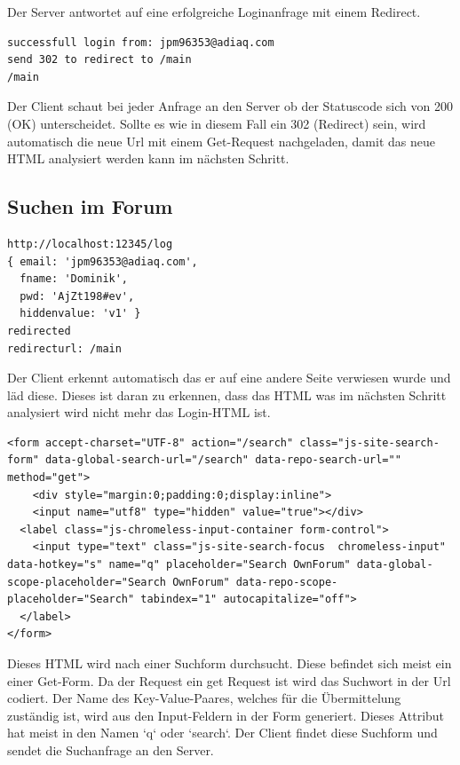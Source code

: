 Der Server antwortet auf eine erfolgreiche Loginanfrage mit einem Redirect.
\begin{lstlisting}[language=HTML5]
successfull login from: jpm96353@adiaq.com
send 302 to redirect to /main
/main
\end{lstlisting}

Der Client schaut bei jeder Anfrage an den Server ob der Statuscode sich von 200 (OK) unterscheidet. Sollte es wie in diesem Fall ein 302 (Redirect) sein, wird automatisch die neue Url mit einem Get-Request nachgeladen, damit das neue HTML analysiert werden kann im nächsten Schritt.
\newpage


\subsection{Suchen im Forum}
\begin{lstlisting}[language=HTML5]
http://localhost:12345/log
{ email: 'jpm96353@adiaq.com',
  fname: 'Dominik',
  pwd: 'AjZt198#ev',
  hiddenvalue: 'v1' }
redirected
redirecturl: /main
\end{lstlisting}


Der Client erkennt automatisch das er auf eine andere Seite verwiesen wurde und läd diese. Dieses ist daran zu erkennen, dass das HTML was im nächsten Schritt analysiert wird nicht mehr das Login-HTML ist.

\begin{lstlisting}[language=HTML5]
<form accept-charset="UTF-8" action="/search" class="js-site-search-form" data-global-search-url="/search" data-repo-search-url="" method="get">
	<div style="margin:0;padding:0;display:inline">
	<input name="utf8" type="hidden" value="true"></div>
  <label class="js-chromeless-input-container form-control">
    <input type="text" class="js-site-search-focus  chromeless-input" data-hotkey="s" name="q" placeholder="Search OwnForum" data-global-scope-placeholder="Search OwnForum" data-repo-scope-placeholder="Search" tabindex="1" autocapitalize="off">
  </label>
</form>
\end{lstlisting}

Dieses HTML wird nach einer Suchform durchsucht. Diese befindet sich meist ein einer Get-Form. Da der Request ein get Request ist wird das Suchwort in der Url codiert. Der Name des Key-Value-Paares, welches für die Übermittelung zuständig ist, wird aus den Input-Feldern in der Form generiert. Dieses Attribut hat meist in den Namen `q` oder `search`. Der Client findet diese Suchform und sendet die Suchanfrage an den Server.


